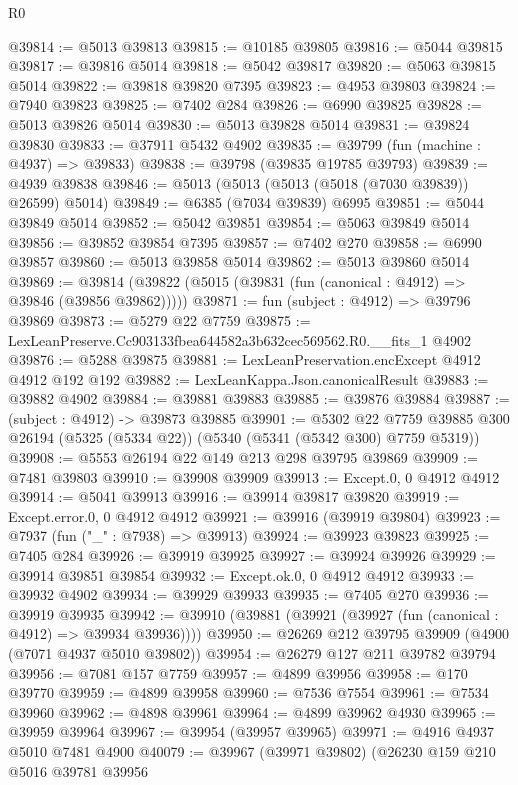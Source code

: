 \begin{lexlean}{R0}
\begin{coremodule}
@39814 := @5013 @39813
@39815 := @10185 @39805
@39816 := @5044 @39815
@39817 := @39816 @5014
@39818 := @5042 @39817
@39820 := @5063 @39815 @5014
@39822 := @39818 @39820 @7395
@39823 := @4953 @39803
@39824 := @7940 @39823
@39825 := @7402 @284
@39826 := @6990 @39825
@39828 := @5013 @39826 @5014
@39830 := @5013 @39828 @5014
@39831 := @39824 @39830
@39833 := @37911 @5432 @4902
@39835 := @39799 (fun (machine : @4937) => @39833)
@39838 := @39798 (@39835 @19785 @39793)
@39839 := @4939 @39838
@39846 := @5013 (@5013 (@5013 (@5018 (@7030 @39839)) @26599) @5014)
@39849 := @6385 (@7034 @39839) @6995
@39851 := @5044 @39849 @5014
@39852 := @5042 @39851
@39854 := @5063 @39849 @5014
@39856 := @39852 @39854 @7395
@39857 := @7402 @270
@39858 := @6990 @39857
@39860 := @5013 @39858 @5014
@39862 := @5013 @39860 @5014
@39869 := @39814 (@39822 (@5015 (@39831 (fun (canonical : @4912) => @39846 (@39856 @39862)))))
@39871 := fun (subject : @4912) => @39796 @39869
@39873 := @5279 @22 @7759
@39875 := LexLeanPreserve.Cc903133fbea644582a3b632cec569562.R0.__fits_1 @4902
@39876 := @5288 @39875
@39881 := LexLeanPreservation.encExcept @4912 @4912 @192 @192
@39882 := LexLeanKappa.Json.canonicalResult
@39883 := @39882 @4902
@39884 := @39881 @39883
@39885 := @39876 @39884
@39887 := (subject : @4912) -> @39873 @39885
@39901 := @5302
    @22
    @7759
    @39885
    @300
    @26194
    (@5325 (@5334 @22))
    (@5340 (@5341 (@5342 @300) @7759 @5319))
@39908 := @5553 @26194 @22 @149 @213 @298 @39795 @39869
@39909 := @7481 @39803
@39910 := @39908 @39909
@39913 := Except.{0, 0} @4912 @4912
@39914 := @5041 @39913
@39916 := @39914 @39817 @39820
@39919 := Except.error.{0, 0} @4912 @4912
@39921 := @39916 (@39919 @39804)
@39923 := @7937 (fun ("_" : @7938) => @39913)
@39924 := @39923 @39823
@39925 := @7405 @284
@39926 := @39919 @39925
@39927 := @39924 @39926
@39929 := @39914 @39851 @39854
@39932 := Except.ok.{0, 0} @4912 @4912
@39933 := @39932 @4902
@39934 := @39929 @39933
@39935 := @7405 @270
@39936 := @39919 @39935
@39942 := @39910 (@39881 (@39921 (@39927 (fun (canonical : @4912) => @39934 @39936))))
@39950 := @26269 @212 @39795 @39909 (@4900 (@7071 @4937 @5010 @39802))
@39954 := @26279 @127 @211 @39782 @39794
@39956 := @7081 @157 @7759
@39957 := @4899 @39956
@39958 := @170 @39770
@39959 := @4899 @39958
@39960 := @7536 @7554
@39961 := @7534 @39960
@39962 := @4898 @39961
@39964 := @4899 @39962 @4930
@39965 := @39959 @39964
@39967 := @39954 (@39957 @39965)
@39971 := @4916 @4937 @5010 @7481 @4900
@40079 := @39967
    (@39971 @39802)
    (@26230
      @159
      @210
      @5016
      @39781
      @39956

\end{coremodule}
\end{lexlean}

